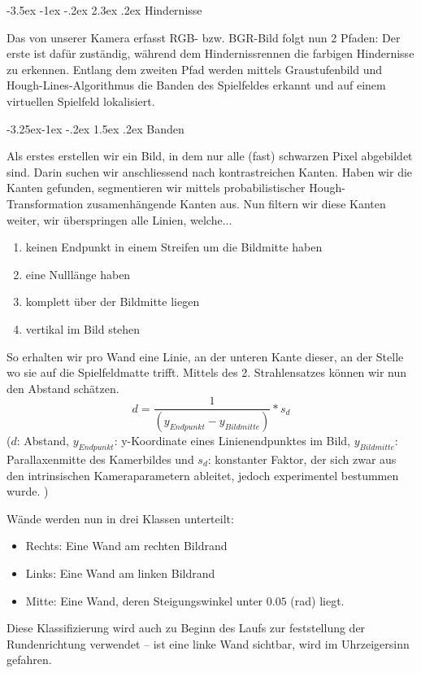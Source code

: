 \documentclass[a4paper]{scrarticle}
\makeatletter
\renewcommand\section{\@startsection {section}{1}{\z@}%
                                   {-3.5ex \@plus -1ex \@minus -.2ex}%
                                   {2.3ex \@plus.2ex}%
                                   {\Huge\AKAfont}}
\renewcommand\subsection{\@startsection{subsection}{2}{\z@}%
                                     {-3.25ex\@plus -1ex \@minus -.2ex}%
                                     {1.5ex \@plus .2ex}%
                                     {\Large\AKAfont}}
\makeatother
\begin{document}
\section{Hindernisse}

Das von unserer Kamera erfasst RGB- bzw. BGR-Bild folgt nun 2 Pfaden: Der erste ist dafür zuständig, während dem Hindernissrennen die farbigen Hindernisse zu erkennen. Entlang dem zweiten Pfad werden mittels Graustufenbild und Hough-Lines-Algorithmus die Banden des Spielfeldes erkannt und auf einem virtuellen Spielfeld lokalisiert.

\subsection{Banden}

Als erstes erstellen wir ein Bild, in dem nur alle (fast) schwarzen Pixel abgebildet sind. Darin suchen wir anschliessend nach kontrastreichen Kanten.
Haben wir die Kanten gefunden, segmentieren wir mittels probabilistischer Hough-Transformation zusamenhängende Kanten aus.
Nun filtern wir diese Kanten weiter, wir überspringen alle Linien, welche...
\begin{enumerate}
	\item {keinen Endpunkt in einem Streifen um die Bildmitte haben}
	\item {eine Nulllänge haben}
	\item {komplett über der Bildmitte liegen}
	\item {vertikal im Bild stehen}
\end{enumerate}
So erhalten wir pro Wand eine Linie, an der unteren Kante dieser, an der Stelle wo sie auf die Spielfeldmatte trifft.
Mittels des 2. Strahlensatzes können wir nun den Abstand schätzen.
$$
d = \frac{1}{(y_{Endpunkt}-y_{Bildmitte})} * s_d
$$
($d$: Abstand, $y_{Endpunkt}$: y-Koordinate eines Linienendpunktes im Bild, $y_{Bildmitte}$: Parallaxenmitte des Kamerbildes und $s_d$: konstanter Faktor, der sich zwar aus den intrinsischen Kameraparametern ableitet, jedoch experimentel bestummen wurde. )

Wände werden nun in drei Klassen unterteilt:
\begin{itemize}
	\item Rechts: Eine Wand am rechten Bildrand
	\item Links: Eine Wand am linken Bildrand
	\item Mitte: Eine Wand, deren Steigungswinkel unter $0.05$ (rad) liegt.
\end{itemize}
Diese Klassifizierung wird auch zu Beginn des Laufs zur feststellung der Rundenrichtung verwendet – ist eine linke Wand sichtbar, wird im Uhrzeigersinn gefahren.
\end{document}
